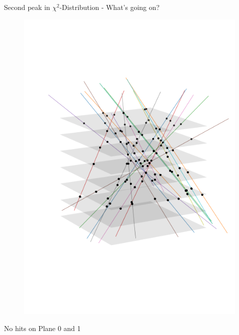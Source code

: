 \documentclass{beamer}
\begin{document}
\begin{frame}{Second peak in \texorpdfstring{\( \chi ^2 \)}{}-Distribution
- What's going on?}
\begin{minipage}{.49\textwidth}
\begin{figure}[H]
	\includegraphics[width=.7\textwidth]{chi2_many_30.png}
    \end{figure}
\end{minipage}
\begin{minipage}{.18\textwidth}
    \footnotesize \begin{turn}{-90}No hits on Plane 0 and 1\end{turn}	
\end{minipage}
\end{frame}
\end{document}
